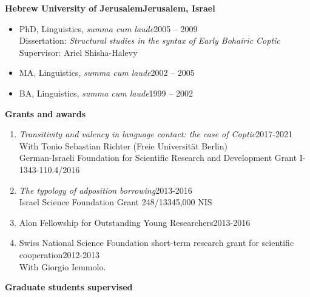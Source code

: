 \documentclass[letterpaper,11pt]{article}
\newcommand{\resheading}[1]{
\vspace*{6pt}
{\large \colorbox{mygrey}{\begin{minipage}{\textwidth}{\textbf{#1 \vphantom{p\^{E}}}}\end{minipage}}}
}
\begin{document}
\vspace*{2pt}
\textbf {{Hebrew University of Jerusalem}\hfill{Jerusalem, Israel}}
\begin{itemize}
\item {PhD, Linguistics, \textit{summa cum laude}}\hfill{2005 -- 2009}\\
Dissertation: \textit{Structural studies in the syntax of Early Bohairic Coptic }\\
Supervisor: Ariel Shisha-Halevy
\item
{MA, Linguistics, \textit{summa cum laude}}\hfill{2002 -- 2005}
\item
{BA, Linguistics, \textit{summa cum laude}}\hfill{1999 -- 2002}
\end{itemize}
\resheading{Grants and awards} 
\vspace*{6pt}
\hspace*{-10.5pt}
\vspace*{6pt}
\begin{enumerate}
\vspace{-0.025 in}
\vspace*{-10pt}
\item {\textit{Transitivity and valency in language contact: the case of Coptic}}\hfill{2017-2021}\\{With Tonio Sebastian Richter (Freie Universit\"at Berlin)}\hfill{}\\{German-Israeli Foundation for Scientific Research and Development Grant I-1343-110.4/2016}
\item{\textit{The typology of adposition borrowing}}\hfill{2013-2016}\\
{Israel Science Foundation Grant 248/13}\hfill{345,000 NIS}
\item {Alon Fellowship for Outstanding Young Researchers}\hfill{2013-2016}
\item{Swiss National Science Foundation short-term research grant for scientific cooperation}\hfill{2012-2013}\\{With Giorgio Iemmolo}\hfill{.}
 

\end{enumerate}
\resheading{Graduate students supervised} 
\hspace*{-10.5pt}
\end{document}
